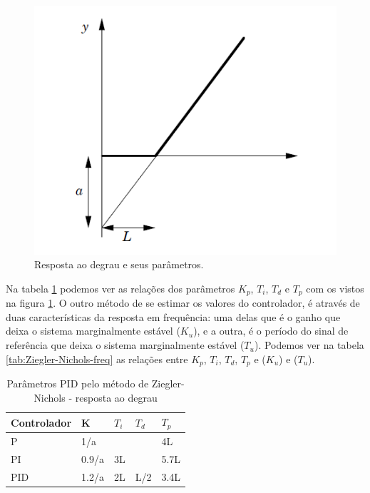 \begin{figure}[H]
  \caption{Resposta ao degrau e seus parâmetros.}
  \begin{center}
      \includegraphics[scale=0.75]{referencial/img/ziegler-nichols_astrom_p135}
  \end{center}
  \label{fig:ziegler-nichols_astrom_p135}
\end{figure}

Na tabela \ref{tab:Ziegler-Nichols} podemos ver as relações dos parâmetros $K_p$, $T_i$, $T_d$ e $T_p$ com os vistos na figura \ref{fig:ziegler-nichols_astrom_p135}. O outro método de se estimar os valores do controlador, é através de duas características da resposta em frequência: uma delas que é o ganho que deixa o sistema marginalmente estável ($K_u$), e a outra, é o período do sinal de referência que deixa o sistema marginalmente estável ($T_u$). Podemos ver na tabela \ref{tab:Ziegler-Nichols-freq} as relações entre $K_p$, $T_i$, $T_d$, $T_p$ e ($K_u$) e ($T_u$).

\begin{table}
  \caption{Parâmetros PID pelo método de Ziegler-Nichols - resposta ao degrau}
  \label{tab:Ziegler-Nichols}
  \centering%
  \begin{minipage}{.42\textwidth}
    \begin{tabular*}{\textwidth}{lllll}
      \hline
      {Controlador} & {K} & {$T_i$} & {$T_d$}& {$T_p$}\\ \hline
      \hline
      P    &  1/a   &     &      & 4L  \\ 
      PI   &  0.9/a & 3L  &      & 5.7L  \\
      PID  &  1.2/a & 2L  & L/2  & 3.4L  \\ \hline
    \end{tabular*}
  \end{minipage}
\end{table}


